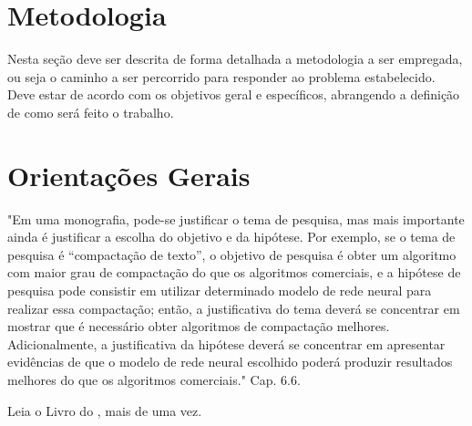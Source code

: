 \documentclass[a4paper,12pt]{article}
\begin{document}
\section{Metodologia}
\label{sc:metodologia}
Nesta seção deve ser descrita de forma detalhada a metodologia a ser empregada, ou seja  o caminho a ser percorrido para responder ao problema estabelecido. Deve estar de acordo com os
objetivos geral e específicos, abrangendo a definição de como será feito o trabalho.



%

%



\newpage
\section{Orientações Gerais}

"Em uma monografia, pode-se justificar o tema de pesquisa, mas mais importante ainda é justificar a escolha do objetivo e da hipótese. Por exemplo, se o tema de pesquisa é “compactação de texto”, o objetivo de pesquisa é obter um algoritmo com maior grau de compactação do que os algoritmos comerciais, e a hipótese de pesquisa pode consistir em utilizar determinado modelo de rede neural para realizar essa compactação; então, a justificativa do tema deverá se concentrar em mostrar que é necessário obter algoritmos de compactação melhores. Adicionalmente, a justificativa da hipótese deverá se concentrar em apresentar evidências de que o modelo de rede neural escolhido poderá produzir resultados melhores do que os algoritmos comerciais." \cite{wazlawick2017metodologia} Cap. 6.6. 

Leia o Livro do \cite{wazlawick2017metodologia}, mais de uma vez.


%

\end{document}
